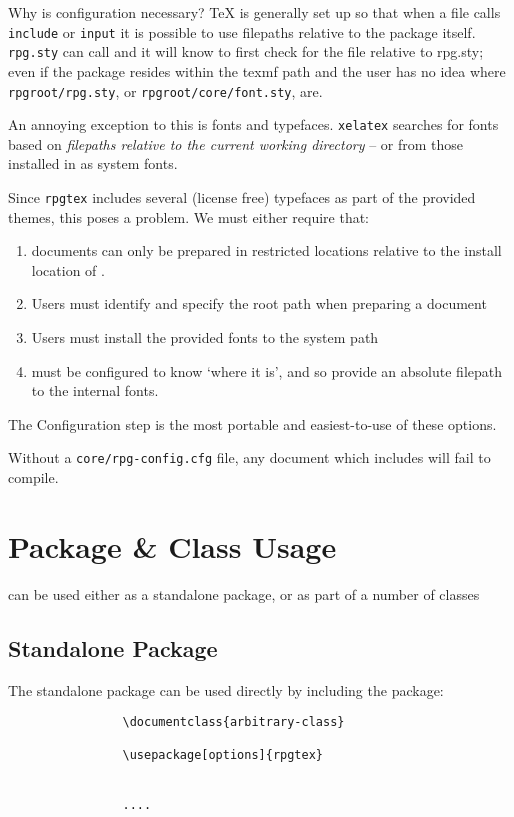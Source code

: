 		\begin{RpgTip}{Why is configuration necessary?}
			\TeX{} is generally set up so that when a file calls \verb|include| or \verb|input| it is possible to use filepaths relative to the package itself. \texttt{rpg.sty} can call \verb|| and it will know to first check for the file relative to rpg.sty; even if the package resides within the texmf path and the user has no idea where \texttt{rpgroot/rpg.sty}, or \texttt{rpgroot/core/font.sty}, are.

			An annoying exception to this is fonts and typefaces. \texttt{xelatex} searches for fonts based on \textit{filepaths relative to the current working directory} -- or from those installed in as system fonts.

			Since \texttt{rpgtex} includes several (license free) typefaces as part of the provided themes, this poses a problem. We must either require that:
			\begin{enumerate}
				\item \rpgtex{} documents can only be prepared in restricted locations relative to the install location of \rpgtex{}.
				\item Users must identify and specify the \rpgtex{} root path when preparing a document
				\item Users must install the provided fonts to the system path
				\item \rpgtex{} must be configured to know `where it is', and so provide an absolute filepath to the internal fonts.
			\end{enumerate}
			The Configuration step is the most portable and easiest-to-use of these options.
		\end{RpgTip}

		Without a \texttt{core/rpg-config.cfg} file, any document which includes \rpgtex{} will fail to compile.
	\newpage

	\section{Package \& Class Usage}

		\rpgtex{} can be used either as a standalone package, or as part of a number of classes

		\subsection{Standalone Package}
			The standalone package can be used directly by including the \rpgtex{} package:
			\begin{lstlisting}
				\documentclass{arbitrary-class}

				\usepackage[options]{rpgtex}

				
				....
			\end{lstlisting}

